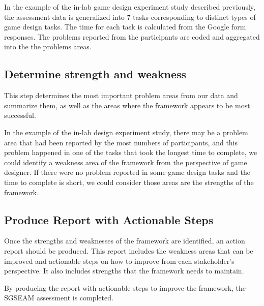 In the example of the in-lab game design experiment study described previously, the assessment data is generalized into 7 tasks
corresponding to distinct types of game design tasks. The time for each task is calculated from the Google form responses. The 
problems reported from the participants are coded and aggregated into the the problems areas. 

\subsection{Determine strength and weakness}

This step determines the most important problem areas from our
data and summarize them, as well as the areas where the framework
appears to be most successful.

In the example of the in-lab design experiment study, there may be a problem area that had been reported by the most numbers
of participants, and this problem happened in one of the tasks that took the longest time to complete, we could identify a weakness 
area of the framework from the perspective of game designer. If there were no problem reported in some game design tasks and 
the time to complete is short, we could consider those areas are the strengths of the framework.

\subsection{Produce Report with Actionable Steps}

Once the strengths and weaknesses of the framework are identified, an action report should be produced.  This report
includes the weakness areas that can be improved and actionable steps
on how to improve from each stakeholder's perspective. It also
includes strengths that the framework needs to maintain.

By producing the report with actionable steps to improve the framework, the SGSEAM assessment is completed.  

